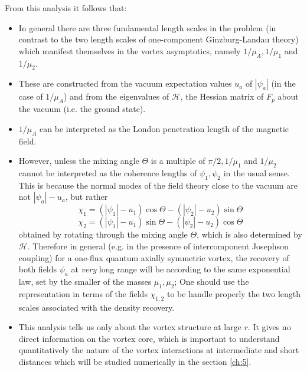 From this analysis it follows that:
\begin{itemize}
    \item In general there are three fundamental length scales in the problem 
        (in contrast to the two length scales of one-component Ginzburg-Landau 
        theory) which manifest themselves in the vortex asymptotics, namely 
        \( 1/\mu_A, 1/\mu_1 \) and \( 1/\mu_2 \).
    \item These are constructed from the vacuum expectation values \( u_a \) 
        of \( |\psi_a| \) (in the case of \( 1/\mu_A \)) and from the 
        eigenvalues of \( \mathcal{H} \), the Hessian matrix of \( F_p \) 
        about the vacuum (i.e. the ground state).
    \item \( 1/\mu_{A} \) can be interpreted as the London penetration length 
        of the magnetic field.
    \item However, unless the mixing angle \( \Theta \) is a multiple of 
        \( \pi/2, 1/\mu_1 \) and \( 1/\mu_2 \) cannot be interpreted as the 
        coherence lengths of \( \psi_1, \psi_2 \) in the usual sense. This is 
        because the normal modes of the field theory close to the vacuum are 
        not \( |\psi_a| - u_a \), but rather
        \[ 
            \chi_1 = (|\psi_1| - u_1)\cos\Theta - (|\psi_2| - u_2)\sin\Theta 
        \]
        \[ 
            \chi_2 = (|\psi_1| - u_1)\sin\Theta - (|\psi_2| - u_2)\cos\Theta 
        \]
        obtained by rotating through the mixing angle \( \Theta \), which is 
        also determined by \( \mathcal{H} \). Therefore in general (e.g. in 
        the presence of intercomponent Josephson coupling) for a one-flux 
        quantum axially symmetric vortex, the recovery of both fields 
        \( \psi_a \) at \emph{very} long range will be according to the same 
        exponential law, set by the smaller of the masses \( \mu_1, \mu_2 \); 
        One should use the representation in terms of the fields 
        \( \chi_{1,2} \) to be handle properly the two length scales 
        associated with the density recovery.
    \item This analysis tells us only about the vortex structure at large 
        \( r \). It gives no direct information on the vortex core, which is 
        important to understand quantitatively the nature of the vortex 
        interactions at intermediate and short distances which will be 
        studied numerically in the section \ref{ch:5}.
\end{itemize}

